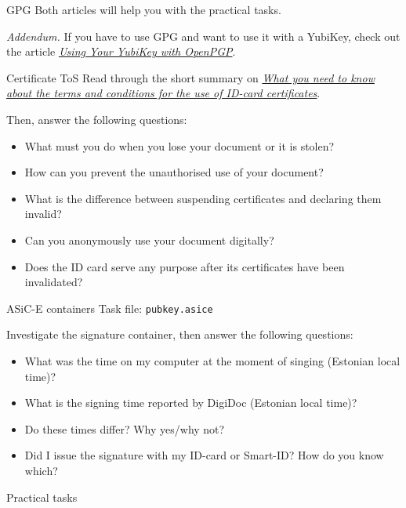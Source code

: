 \documentclass{homework}
\begin{document}
\begin{task}{GPG}
  Both articles will help you with the practical tasks.

  \textit{Addendum.}
  If you have to use GPG and want to use it with a YubiKey, check out the article \href{https://support.yubico.com/hc/en-us/articles/360013790259-Using-Your-YubiKey-with-OpenPGP}{\textit{Using Your YubiKey with OpenPGP}}.
\end{task}

\begin{task}{Certificate ToS}
  Read through the short summary on \href{https://www.id.ee/en/article/compete-information-about-the-terms-of-use-of-certificates/\#what-you-need_2}{\textit{What you need to know about the terms and conditions for the use of ID-card certificates}}.

  Then, answer the following questions:
  \begin{itemize}
    \item What must you do when you lose your document or it is stolen?
    \item How can you prevent the unauthorised use of your document?
    \item What is the difference between suspending certificates and declaring them invalid?
    \item Can you anonymously use your document digitally?
    \item Does the ID card serve any purpose after its certificates have been invalidated?
  \end{itemize}
\end{task}

\begin{task}{ASiC-E containers}
  Task file: \texttt{pubkey.asice}

  Investigate the signature container, then answer the following questions:
  \begin{itemize}
    \item What was the time on my computer at the moment of singing (Estonian local time)?
    \item What is the signing time reported by DigiDoc (Estonian local time)?
    \item Do these times differ? Why yes/why not?
    \item Did I issue the signature with my ID-card or Smart-ID?
    How do you know which?
  \end{itemize}
\end{task}

\newpage
\setcounter{task}{0}

\begin{center}
  Practical tasks
\end{center}
\end{document}
